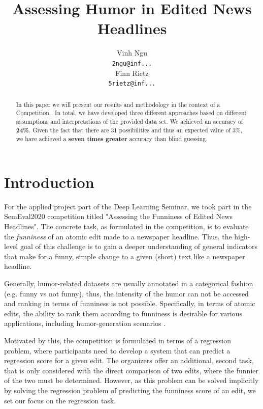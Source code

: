 \documentclass[11pt,a4paper]{article}
\title{Assessing Humor in Edited News Headlines}
\author{Vinh Ngu \\
  {\tt 2ngu@inf...} \\\And
  Finn Rietz \\
  {\tt 5rietz@inf...} \\}
\date{}
\begin{document}
\maketitle

\begin{abstract}
In this paper we will present our results and methodology in the context of a Competition . In total, we have developed three different approaches based on different assumptions and interpretations of the provided data set. We achieved an accuracy of \textbf{24\%}. Given the fact that there are 31 possibilities and thus an expected value of 3\%, we have achieved a \textbf{seven times greater} accuracy than blind guessing.
\end{abstract}

\section{Introduction}
For the applied project part of the Deep Learning Seminar, we took part in the SemEval2020 competition titled "Assessing the Funniness of Edited News Headlines". The concrete task, as formulated in the competition, is to evaluate the \textit{funniness} of an atomic edit made to a newspaper headline. Thus, the high-level goal of this challenge is to gain a deeper understanding of general indicators that make for a funny, simple change to a given (short) text like a newspaper headline.

Generally, humor-related datasets are usually annotated in a categorical fashion (e.g. funny vs not funny), thus, the intensity of the humor can not be accessed and ranking in terms of {funniness} is not possible. Specifically, in terms of atomic edits, the ability to rank them according to funniness is desirable for various applications, including humor-generation scenarios \cite{hossain-etal-2019-president}. 

Motivated by this, the competition is formulated in terms of a regression problem, where participants need to develop a system that can predict a regression score for a given edit. The organizers offer an additional, second task, that is only considered with the direct comparison of two edits, where the funnier of the two must be determined. However, as this problem can be solved implicitly by solving the regression problem of predicting the funniness score of an edit, we set our focus on the regression task.
\end{document}
